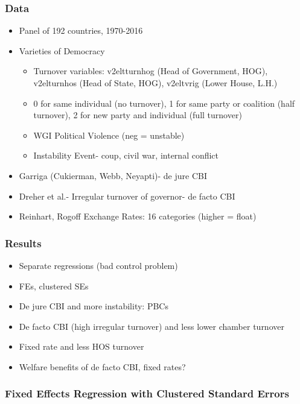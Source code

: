 \documentclass{beamer}
\begin{document}
    \begin{frame}
        \frametitle{Data}
        \begin{itemize}
            \item Panel of 192 countries, 1970-2016
            \item Varieties of Democracy
            \begin{itemize}
                \item Turnover variables: v2eltturnhog (Head of Government, HOG), v2elturnhos (Head of State, HOG), v2eltvrig (Lower House, L.H.)
                \item 0 for same individual (no turnover), 1 for same party or coalition (half turnover), 2 for new party and individual (full turnover)
                \item WGI Political Violence (neg = unstable)
                \item Instability Event- coup, civil war, internal conflict
            \end{itemize}
            \item Garriga (Cukierman, Webb, Neyapti)- de jure CBI
            \item Dreher et al.- Irregular turnover of governor- de facto CBI
            \item Reinhart, Rogoff Exchange Rates: 16 categories (higher = float)
        \end{itemize}
    \end{frame}

    \begin{frame}
        \frametitle{Results}
        \begin{itemize}
            \item Separate regressions (bad control problem)
            \item FEs, clustered SEs
            \item De jure CBI and more instability: PBCs
            \item De facto CBI (high irregular turnover) and less lower chamber turnover
            \item Fixed rate and less HOS turnover
            \item Welfare benefits of de facto CBI, fixed rates?
        \end{itemize}
    \end{frame}

    \begin{frame}
        \frametitle{Fixed Effects Regression with Clustered Standard Errors}
        {
            \let\oldcentering\centering
            \renewcommand\centering{\tiny\oldcentering}
            
        }
    \end{frame}
\end{document}
